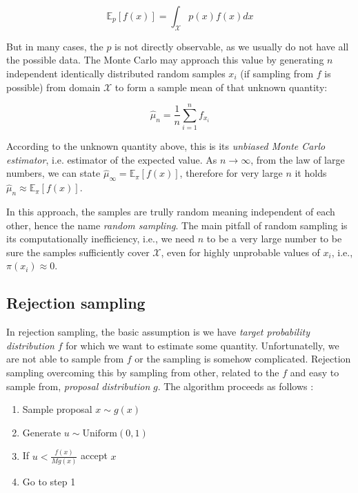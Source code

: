 \documentclass[
  digital, %
  oneside, %
  lof,     %
  lot,     %
]{fithesis4}
\begin{document}
\begin{equation}\label{eq:random-sampling-expectation}
  \mathbb{E}_{p}\left[ f(x) \right] = \int_{\mathcal{X}} p \left( x \right) f \left( x \right) dx
\end{equation}

But in many cases, the $p$ is not directly 
observable, as we usually do not have all the 
possible data.
The Monte Carlo may approach this value by 
generating $n$ independent identically distributed 
random samples $x_i$ (if sampling from $f$ is 
possible) from domain $\mathcal{X}$ to form a 
sample mean of that unknown quantity:

\begin{equation}
  \hat{\mu}_n = \frac{1}{n} \sum_{i=1}^{n} f_{x_i}
\end{equation}

According to the unknown quantity above, this 
is its \textit{unbiased Monte Carlo estimator}, i.e. 
estimator of the expected value. 
As $n \to \infty$, from the law of large numbers, 
we can state 
$\hat{\mu}_{\infty} = \mathbb{E}_{\pi}\left[ f(x) \right]$, 
therefore for very large $n$ it holds 
$\hat{\mu}_n \approx \mathbb{E}_{\pi}\left[ f(x) \right]$.

In this approach, the samples are trully 
random meaning independent of each other, 
hence the name \textit{random sampling}.
The main pitfall of random sampling is its 
computationally inefficiency, i.e., we 
need $n$ to be a very large number to be 
sure the samples sufficiently cover 
$\mathcal{X}$, even for highly unprobable
values of $x_i$, i.e., $\pi(x_i) \approx 0$.


\subsection{Rejection sampling}
\label{sec:rejection-sampling}

In rejection sampling, the basic assumption is we have \textit{target
probability distribution} $f$ for which we want to estimate
some quantity. Unfortunatelly, we are not able to sample
from $f$ or the sampling is somehow complicated.
Rejection sampling overcoming this by sampling
from other, related to the $f$ and easy to sample from, 
\textit{proposal distribution} $g$.
The algorithm proceeds as follows \cite{beichl2000}:

\begin{enumerate}
  \item Sample proposal $x \sim g(x)$
  \item Generate $u \sim \text{Uniform}(0, 1)$
  \item If $u < \frac{f(x)}{M g(x)}$ accept $x$
  \item Go to step 1
\end{enumerate}
\end{document}

